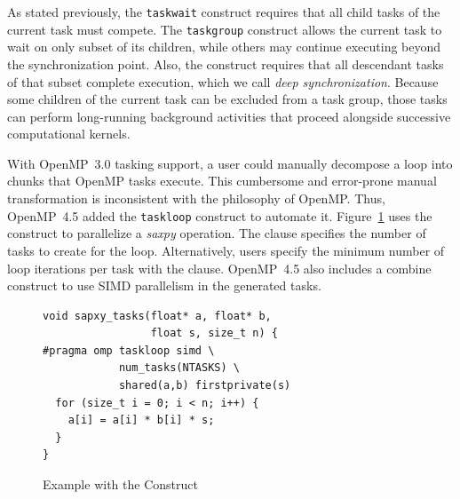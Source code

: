 As stated previously, the \texttt{taskwait} construct requires that all child 
tasks of the current task must compete. The \texttt{taskgroup} construct 
allows the current task to wait on only subset of its children, while others 
may continue executing beyond the synchronization point. Also, the construct
requires that all descendant tasks of that subset complete execution, which
we call \emph{deep synchronization}. Because some children of the current 
task can be excluded from a task group, those tasks can perform long-running 
background activities that proceed alongside successive computational kernels.

\label{sec:Taskloop}
With OpenMP~3.0 tasking support, a user could manually decompose a loop into 
chunks that OpenMP tasks execute. This cumbersome and error-prone manual 
transformation is inconsistent with the philosophy of OpenMP. Thus, OpenMP~4.5
added the \texttt{taskloop} construct to automate it. 
Figure~\ref{fig:TaskloopExample} uses the construct to parallelize a 
\emph{saxpy} operation. The  clause specifies the number of 
tasks to create for the loop. Alternatively, users specify the minimum number 
of loop iterations per task with the  clause. OpenMP~4.5
also includes a combine  construct to use SIMD parallelism
in the generated tasks.

\begin{figure}
\begin{verbatim}
void sapxy_tasks(float* a, float* b,
                 float s, size_t n) {
#pragma omp taskloop simd \
            num_tasks(NTASKS) \
            shared(a,b) firstprivate(s)
  for (size_t i = 0; i < n; i++) {
    a[i] = a[i] * b[i] * s;
  }
}
\end{verbatim}
\caption{Example with the  Construct\label{fig:TaskloopExample}}
\end{figure}
